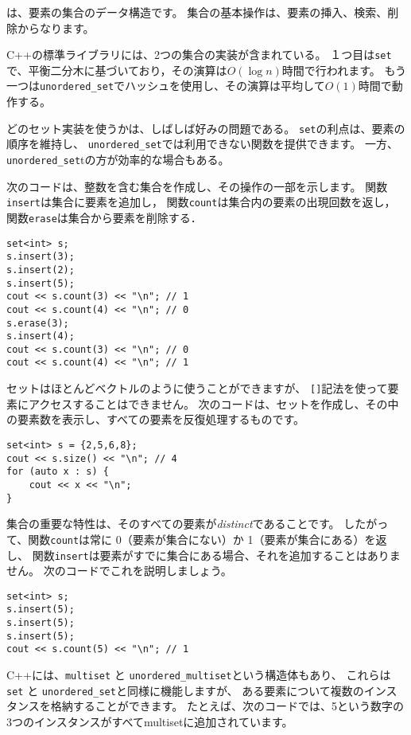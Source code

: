 
は、要素の集合のデータ構造です。
集合の基本操作は、要素の挿入、検索、削除からなります。

C++の標準ライブラリには、2つの集合の実装が含まれている。
１つ目は\texttt{set}で、平衡二分木に基づいており，その演算は$O(\log n)$時間で行われます。
もう一つは\texttt{unordered\_set}でハッシュを使用し、その演算は平均して$O(1)$時間で動作する。

どのセット実装を使うかは、しばしば好みの問題である。
\texttt{set}の利点は、要素の順序を維持し、
\texttt{unordered\_set}では利用できない関数を提供できます。
一方、\texttt{unordered\_set}tの方が効率的な場合もある。

次のコードは、整数を含む集合を作成し、その操作の一部を示します。
関数\texttt{insert}は集合に要素を追加し，
関数\texttt{count}は集合内の要素の出現回数を返し，
関数\texttt{erase}は集合から要素を削除する．

\begin{lstlisting}
set<int> s;
s.insert(3);
s.insert(2);
s.insert(5);
cout << s.count(3) << "\n"; // 1
cout << s.count(4) << "\n"; // 0
s.erase(3);
s.insert(4);
cout << s.count(3) << "\n"; // 0
cout << s.count(4) << "\n"; // 1
\end{lstlisting}

セットはほとんどベクトルのように使うことができますが、
\texttt{[]}記法を使って要素にアクセスすることはできません。
次のコードは、セットを作成し、その中の要素数を表示し、すべての要素を反復処理するものです。

\begin{lstlisting}
set<int> s = {2,5,6,8};
cout << s.size() << "\n"; // 4
for (auto x : s) {
    cout << x << "\n";
}
\end{lstlisting}

集合の重要な特性は、そのすべての要素が\emph{distinct}であることです。
したがって、関数\texttt{count}は常に
0（要素が集合にない）か
1（要素が集合にある）を返し、
関数\texttt{insert}は要素がすでに集合にある場合、それを追加することはありません。
次のコードでこれを説明しましょう。

\begin{lstlisting}
set<int> s;
s.insert(5);
s.insert(5);
s.insert(5);
cout << s.count(5) << "\n"; // 1
\end{lstlisting}

C++には、\texttt{multiset} と \texttt{unordered\_multiset}という構造体もあり、
これらは\texttt{set} と \texttt{unordered\_set}と同様に機能しますが、
ある要素について複数のインスタンスを格納することができます。
たとえば、次のコードでは、5という数字の3つのインスタンスがすべてmultisetに追加されています。

